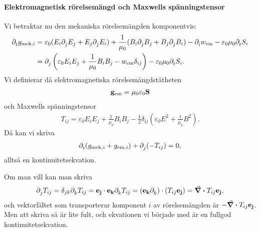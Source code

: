 \paragraph{Elektromagnetisk rörelsemängd och Maxwells spänningstensor}
Vi betraktar nu den mekaniska rörelsemängden komponentvis:
\begin{align*}
	\partial_{t}^{}g_{\text{mek}, i} &= \varepsilon_{0}(E_{i}\partial_{j}^{}E_{j} + E_{j}\partial_{j}^{}E_{i}) + \frac{1}{\mu_{0}}(B_{i}\partial_{j}^{}B_{j} + B_{j}\partial_{j}^{}B_{i}) - \partial_{i}^{}w_{\text{em}} - \varepsilon_{0}\mu_{0}\partial_{t}^{}S_{i} \\
	                                &= \partial_{j}^{}\left(\varepsilon_{0}E_{i}E_{j} + \frac{1}{\mu_{0}}B_{i}B_{j} - w_{\text{em}}\delta_{ij}\right) - \varepsilon_{0}\mu_{0}\partial_{t}^{}S_{i}.
\end{align*}
Vi definierar då elektromagnetiska rörelsemängdstätheten
\begin{align*}
	\vb{g}_{\text{em}} = \mu_{0}\varepsilon_{0}\vb{S}
\end{align*}
och Maxwells spänningstensor
\begin{align*}
	T_{ij} = \varepsilon_{0}E_{i}E_{j} + \frac{1}{\mu_{0}}B_{i}B_{j} - \frac{1}{2}\delta_{ij}\left(\varepsilon_{0}E^{2} + \frac{1}{\mu_{0}}B^{2}\right).
\end{align*}
Då kan vi skriva
\begin{align*}
	\partial_{t}^{}(g_{\text{mek}, i} + g_{\text{em}, i}) + \partial_{j}^{}(-T_{ij}) = 0,
\end{align*}
alltså en kontinuitetsekvation.

Om man vill kan man skriva
\begin{align*}
	\partial_{j}^{}T_{ij} = \delta_{jk}\partial_{k}^{}T_{ij} = \vb{e}_{\vb{j}}\cdot\vb{e}_{\vb{k}}\partial_{k}^{}T_{ij} = (\vb{e}_{\vb{k}}\partial_{k}^{}){}\cdot({T_{ij}\vb{e}_{\vb{j}}}) = \div{{T_{ij}\vb{e}_{\vb{j}}}},
\end{align*}
och vektorfältet som transporterar komponent $i$ av rörelsemängden är $-\div{{T_{ij}\vb{e}_{\vb{j}}}}$. Men att skriva så är lite fult, och ekvationen vi började med är en fullgod kontinuitetsekvation.


